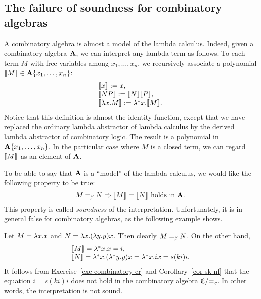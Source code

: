 \documentclass{article}
\begin{document}
\subsection{The failure of soundness for combinatory algebras}

A combinatory algebra is almost a model of the lambda calculus.
Indeed, given a combinatory algebra ${\bf A}$, we can interpret any lambda
term as follows. To each term $M$ with free variables among
$x_1,\ldots,x_n$, we recursively associate a polynomial
$[\![M]\!]_{}\in{\bf A}\{x_1,\ldots,x_n\}$:
\[ \begin{array}{lll}
  \semm{x} := x, \\
  \semm{NP} := \semm{N}\semm{P}, \\
  \semm{\lam x.M} := \lam^*x.\semm{M}.\\
\end{array}
\]
Notice that this definition is almost the identity function, except
that we have replaced the ordinary lambda abstractor of lambda
calculus by the derived lambda abstractor of combinatory logic. The
result is a polynomial in ${\bf A}\{x_1,\ldots,x_n\}$. In the particular
case where $M$ is a closed term, we can regard $[\![M]\!]_{}$ as an
element of ${\bf A}$.

To be able to say that ${\bf A}$ is a ``model'' of the lambda calculus, we
would like the following property to be true:
\[ M=_{\beta} N \Rightarrow [\![M]\!]_{}=[\![N]\!]_{}\mbox{ holds in ${\bf A}$}.
\]
This property is called {\em soundness} of the interpretation.
Unfortunately, it is in general false for combinatory algebras, as the
following example shows.

\begin{example}\label{exa-failure-sound}
  Let $M=\lambda x.x$ and $N=\lambda x.(\lambda y.y)x$. Then clearly
  $M=_{\beta} N$. On the other hand, 
  \[ \begin{array}{l}
    \semm{M} = \lam^*x.x=i, \\
    \semm{N} = \lam^*x.(\lam^*y.y)x = \lam^*x.ix
    = s(ki)i.
  \end{array}
  \]
  It follows from Exercise~\ref{exe-combinatory-cr} and
  Corollary~\ref{cor-sk-nf} that the equation $i=s(ki)i$ does not hold
  in the combinatory algebra ${\mathfrak C}/{=_{\it c}}$. In other words, the
  interpretation is not sound.
\end{example}
\end{document}
